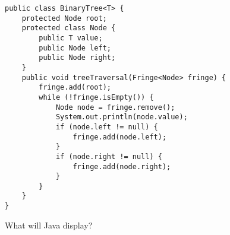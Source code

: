 \question \begin{lstlisting}
public class BinaryTree<T> {
    protected Node root;
    protected class Node {
        public T value;
        public Node left;
        public Node right;
    }
    public void treeTraversal(Fringe<Node> fringe) {
        fringe.add(root);
        while (!fringe.isEmpty()) {
            Node node = fringe.remove();
            System.out.println(node.value);
            if (node.left != null) {
                fringe.add(node.left);
            }
            if (node.right != null) {
                fringe.add(node.right);
            }
        }
    }
}
\end{lstlisting}


What will Java display?

